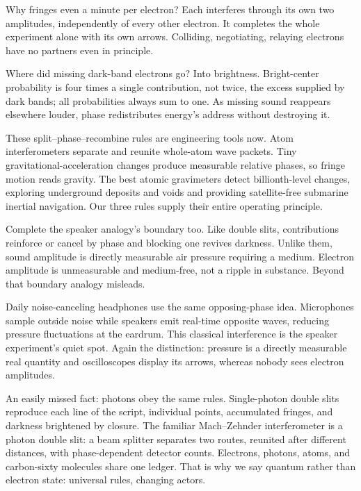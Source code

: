 Why fringes even a minute per electron? Each interferes through its own two amplitudes, independently of every other electron. It completes the whole experiment alone with its own arrows. Colliding, negotiating, relaying electrons have no partners even in principle.

Where did missing dark-band electrons go? Into brightness. Bright-center probability is four times a single contribution, not twice, the excess supplied by dark bands; all probabilities always sum to one. As missing sound reappears elsewhere louder, phase redistributes energy's address without destroying it.

These split--phase--recombine rules are engineering tools now. Atom interferometers separate and reunite whole-atom wave packets. Tiny gravitational-acceleration changes produce measurable relative phases, so fringe motion reads gravity. The best atomic gravimeters detect billionth-level changes, exploring underground deposits and voids and providing satellite-free submarine inertial navigation. Our three rules supply their entire operating principle.

Complete the speaker analogy's boundary too. Like double slits, contributions reinforce or cancel by phase and blocking one revives darkness. Unlike them, sound amplitude is directly measurable air pressure requiring a medium. Electron amplitude is unmeasurable and medium-free, not a ripple in substance. Beyond that boundary analogy misleads.

Daily noise-canceling headphones use the same opposing-phase idea. Microphones sample outside noise while speakers emit real-time opposite waves, reducing pressure fluctuations at the eardrum. This classical interference is the speaker experiment's quiet spot. Again the distinction: pressure is a directly measurable real quantity and oscilloscopes display its arrows, whereas nobody sees electron amplitudes.

An easily missed fact: photons obey the same rules. Single-photon double slits reproduce each line of the script, individual points, accumulated fringes, and darkness brightened by closure. The familiar Mach--Zehnder interferometer is a photon double slit: a beam splitter separates two routes, reunited after different distances, with phase-dependent detector counts. Electrons, photons, atoms, and carbon-sixty molecules share one ledger. That is why we say quantum rather than electron state: universal rules, changing actors.


